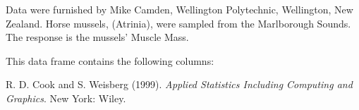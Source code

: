 \begin{Description}\relax
Data were furnished by Mike Camden, Wellington Polytechnic, Wellington,
New Zealand.  Horse mussels, (Atrinia), were sampled from the Marlborough
Sounds.  The response is the mussels' Muscle Mass.
\end{Description}
\begin{Format}\relax
This data frame contains the following columns:
\end{Format}
\begin{Details}\relax
\end{Details}
\begin{Source}\relax
R. D. Cook and S. Weisberg (1999). \emph{Applied
Statistics Including Computing and Graphics}.  New York:  Wiley.
\end{Source}

